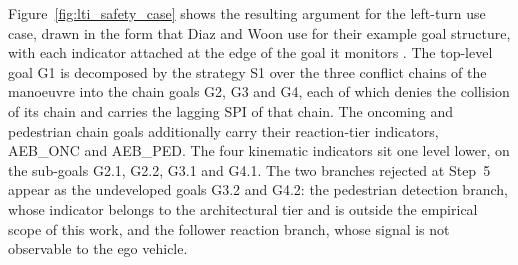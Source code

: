 Figure~\ref{fig:lti_safety_case} shows the resulting argument for the left-turn
use case, drawn in the form that Diaz and Woon use for their example goal structure,
with each indicator attached at the edge of the goal it monitors
\cite{diaz2022drspi}. The top-level goal G1 is decomposed by the strategy S1 over
the three conflict chains of the manoeuvre into the chain goals G2, G3 and G4, each
of which denies the collision of its chain and carries the lagging SPI of
that chain. The oncoming and pedestrian chain goals additionally carry their
reaction-tier indicators, AEB\_ONC and AEB\_PED. The four kinematic indicators sit
one level lower, on the sub-goals G2.1, G2.2, G3.1 and G4.1. The two branches
rejected at Step~5 appear as the undeveloped goals G3.2 and G4.2: the pedestrian
detection branch, whose indicator belongs to the architectural tier and is outside
the empirical scope of this work, and the follower reaction branch, whose signal is
not observable to the ego vehicle.

